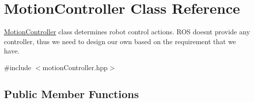 \hypertarget{classMotionController}{}\section{Motion\+Controller Class Reference}
\label{classMotionController}


\hyperlink{classMotionController}{Motion\+Controller} class determine\textquotesingle{}s robot control actions. R\+OS doesn\textquotesingle{}t provide any controller, thus we need to design our own based on the requirement that we have.  




{\ttfamily \#include $<$motion\+Controller.\+hpp$>$}

\subsection*{Public Member Functions}
